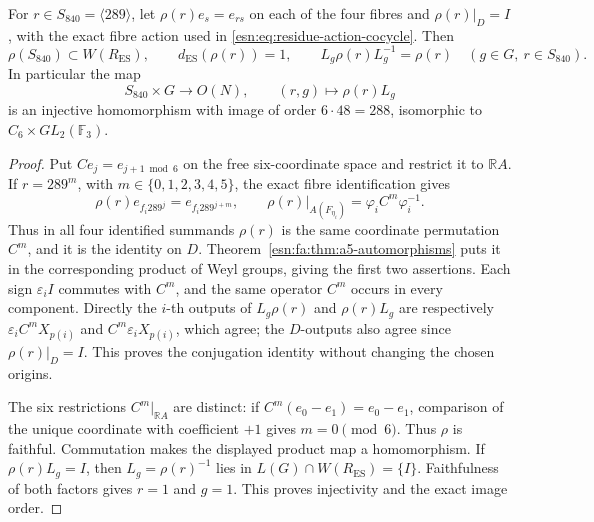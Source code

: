 \begin{theorem}
\label{esn:fa:thm:residue-weyl}
For \(r\in S_{840}=\langle289\rangle\), let
\(\rho(r)e_s=e_{rs}\) on each of the four fibres and
\(\rho(r)|_D=I\), with the exact fibre action used in
\eqref{esn:eq:residue-action-cocycle}.
Then
\begin{equation}
 \rho(S_{840})\subset W(R_{\mathrm{ES}}),\qquad
 d_{\mathrm{ES}}(\rho(r))=1,\qquad
 L_g\rho(r)L_g^{-1}=\rho(r)
       \quad(g\in G,\ r\in S_{840}).
 \label{esn:fa:eq:residue-position}
\end{equation}
In particular the map
\[
 S_{840}\times G\longrightarrow O(N),\qquad(r,g)\longmapsto\rho(r)L_g
\]
is an injective homomorphism with image of order \(6\cdot48=288\),
isomorphic to \(C_6\times GL_2(\mathbb F_3)\).
\end{theorem}

\begin{proof}
Put \(C e_j=e_{j+1\bmod6}\) on the free six-coordinate space and
restrict it to \(\mathbb R A\).  If
\(r=289^m\), with \(m\in\{0,1,2,3,4,5\}\), the exact fibre
identification gives
\[
 \rho(r)e_{f_i289^j}=e_{f_i289^{j+m}},\qquad
 \rho(r)|_{A(F_{\eta_i})}=\varphi_iC^m\varphi_i^{-1}.
\]
Thus in all four identified summands \(\rho(r)\) is the same
coordinate permutation \(C^m\), and it is the identity on \(D\).
Theorem~\ref{esn:fa:thm:a5-automorphisms} puts it in the corresponding
product of Weyl groups, giving the first two assertions.
Each sign \(\varepsilon_i I\) commutes with \(C^m\), and the
same operator \(C^m\) occurs in every component.  Directly the
\(i\)-th outputs of \(L_g\rho(r)\) and \(\rho(r)L_g\) are
respectively
\(\varepsilon_iC^mX_{p(i)}\) and
\(C^m\varepsilon_iX_{p(i)}\), which agree; the \(D\)-outputs
also agree since \(\rho(r)|_D=I\).
This proves the conjugation identity without changing the chosen origins.

The six restrictions \(C^m|_{\mathbb R A}\) are distinct: if
\(C^m(e_0-e_1)=e_0-e_1\), comparison of the unique coordinate with
coefficient \(+1\) gives \(m=0\pmod6\).
Thus \(\rho\) is faithful.  Commutation makes the displayed product
map a homomorphism.  If \(\rho(r)L_g=I\), then
\(L_g=\rho(r)^{-1}\) lies in
\(L(G)\cap W(R_{\mathrm{ES}})=\{I\}\).
Faithfulness of both factors gives \(r=1\) and \(g=1\).
This proves injectivity and the exact image order.
\end{proof}
